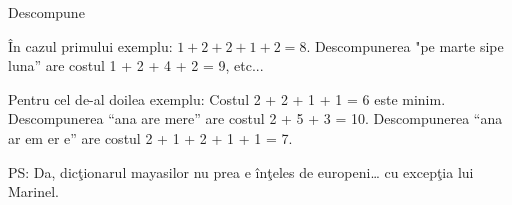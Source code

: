 \begin{problem}{Descompune}
\Example

\begin{example}
%
%
\end{example}

\Explanation

\^{I}n cazul primului exemplu: $1 + 2 + 2 + 1 + 2 = 8$. Descompunerea "pe marte sipe luna” are costul 1 + 2 + 4 + 2 = 9, etc...

Pentru cel de-al doilea exemplu: Costul 2 + 2 + 1 + 1 = 6 este minim. Descompunerea “ana are mere” are costul 2 + 5 + 3 = 10. Descompunerea “ana ar em er e” are costul 2 + 1 + 2 + 1 + 1 = 7.

PS: Da, dic\c{t}ionarul mayasilor nu prea e \^{i}n\c{t}eles de europeni… cu excep\c{t}ia lui Marinel.

\end{problem}
